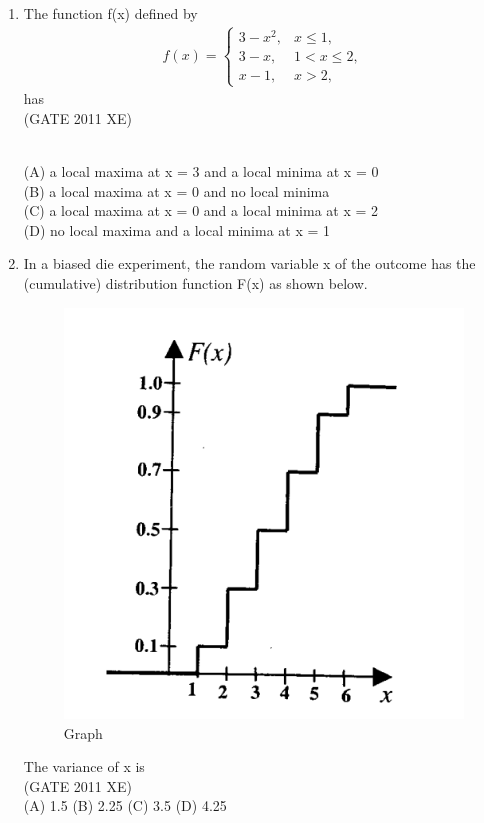 \documentclass[journal,12pt,onecolumn]{IEEEtran}
\begin{document}
\begin{enumerate}
\begin{enumerate}
\begin{enumerate}[label=\textbf{Q\arabic*.},itemsep=2em]
\item The function f(x) defined by
\begin{align} 
f(x) = 
\begin{cases} 
3 - x^2, & x \leq 1, \\
3 - x, & 1 < x \leq 2, \\
x - 1, & x > 2,
\end{cases}
\end{align}
has\\ 

\hfill{(GATE 2011 XE)} \\\
\begin{multicols}{2}
(A) a local maxima at x = 3 and a local minima at x = 0 \\
(B) a local maxima at x = 0 and no local minima \\ 
(C) a local maxima at x = 0 and a local minima at x = 2 \\
(D) no local maxima and a local minima at x = 1
\end{multicols}


\item In a biased die experiment, the random variable x of the outcome has the (cumulative) distribution function F(x) as shown below.

\begin{figure}[htbp]
  \centering
  \includegraphics[width=.6\columnwidth]{figs/A/fig1.png}
  \caption{Graph}
  \label{fig:figs/A/fig1.png}
\end{figure}


The variance of x is\\

\hfill{(GATE 2011 XE)} \\
(A) 1.5 
(B) 2.25 
(C) 3.5   
(D) 4.25   


\end{enumerate}
\end{enumerate}
\end{enumerate}
\end{document}
